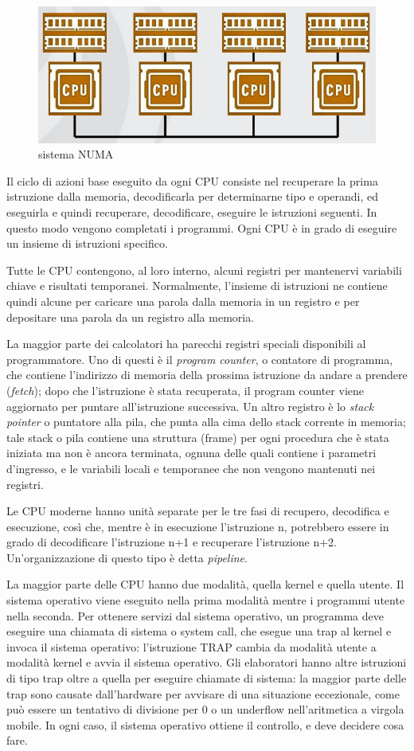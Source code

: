 \begin{figure}[!ht]
    \centering
    \includegraphics[width=0.7\linewidth]{assets/numa1.png}
    \caption{sistema NUMA}
\end{figure}

Il ciclo di azioni base eseguito da ogni CPU consiste nel recuperare la prima istruzione dalla memoria, decodificarla per determinarne tipo e operandi, ed eseguirla e quindi recuperare, decodificare, eseguire le istruzioni seguenti. In questo modo vengono completati i programmi. Ogni CPU è in grado di eseguire un insieme di istruzioni specifico.

Tutte le CPU contengono, al loro interno, alcuni registri per mantenervi variabili chiave e risultati temporanei. Normalmente, l'insieme di istruzioni ne contiene quindi alcune per caricare una parola dalla memoria in un registro e per depositare una parola da un registro alla memoria.

La maggior parte dei calcolatori ha parecchi registri speciali disponibili al programmatore. Uno di questi è il \textit{program counter}, o contatore di programma, che contiene l'indirizzo di memoria della prossima istruzione da andare a prendere (\textit{fetch}); dopo che l'istruzione è stata recuperata, il program counter viene aggiornato per puntare all'istruzione successiva. 
Un altro registro è lo \textit{stack pointer} o puntatore alla pila, che punta alla cima dello stack corrente in memoria; tale stack o pila contiene una struttura (frame) per ogni procedura che è stata iniziata ma non è ancora terminata, ognuna delle quali contiene i parametri d'ingresso, e le variabili locali e temporanee che non vengono mantenuti nei registri.

Le CPU moderne hanno unità separate per le tre fasi di recupero, decodifica e esecuzione, così che, mentre è in esecuzione l'istruzione n, potrebbero essere in grado di decodificare l'istruzione n+1 e recuperare l'istruzione n+2. Un'organizzazione di questo tipo è detta \textit{pipeline}.

La maggior parte delle CPU hanno due modalità, quella kernel e quella utente.
Il sistema operativo viene eseguito nella prima modalità mentre i programmi utente nella seconda. Per ottenere servizi dal sistema operativo, un programma deve eseguire una chiamata di sistema o system call, che esegue una trap al kernel e invoca il sistema operativo: l'istruzione TRAP cambia da modalità utente a modalità kernel e avvia il sistema operativo.
Gli elaboratori hanno altre istruzioni di tipo trap oltre a quella per eseguire chiamate di sistema: la maggior parte delle trap sono causate dall'hardware per avvisare di una situazione eccezionale, come può essere un tentativo di divisione per 0 o un underflow nell'aritmetica a virgola mobile. In ogni caso, il sistema operativo ottiene il controllo, e deve decidere cosa fare.

